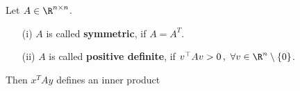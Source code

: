 Let $A \in \R^{n\times n}$. 
\begin{itemize}
\item[(i)] $A$ is called \textbf{symmetric}, if $A = A^T$.
\item[(ii)] $A$ is called \textbf{positive definite}, if $v^\top Av>0\, ,\ \forall v\in\R^n\setminus\{0\}$.
\end{itemize}

Then $x^TAy$ defines an inner product
